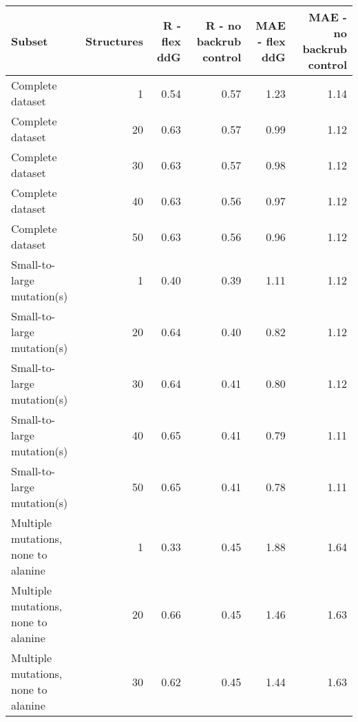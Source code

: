 \begin{table}
\begin{tabular}{lrrrrr}
\toprule
                              Subset &  Structures &  R - flex ddG &  R - no backrub control &  MAE - flex ddG &  MAE - no backrub control \\
\midrule
                    Complete dataset &           1 &          0.54 &                    0.57 &            1.23 &                      1.14 \\
                    Complete dataset &          20 &          0.63 &                    0.57 &            0.99 &                      1.12 \\
                    Complete dataset &          30 &          0.63 &                    0.57 &            0.98 &                      1.12 \\
                    Complete dataset &          40 &          0.63 &                    0.56 &            0.97 &                      1.12 \\
                    Complete dataset &          50 &          0.63 &                    0.56 &            0.96 &                      1.12 \\
          Small-to-large mutation(s) &           1 &          0.40 &                    0.39 &            1.11 &                      1.12 \\
          Small-to-large mutation(s) &          20 &          0.64 &                    0.40 &            0.82 &                      1.12 \\
          Small-to-large mutation(s) &          30 &          0.64 &                    0.41 &            0.80 &                      1.12 \\
          Small-to-large mutation(s) &          40 &          0.65 &                    0.41 &            0.79 &                      1.11 \\
          Small-to-large mutation(s) &          50 &          0.65 &                    0.41 &            0.78 &                      1.11 \\
 Multiple mutations, none to alanine &           1 &          0.33 &                    0.45 &            1.88 &                      1.64 \\
 Multiple mutations, none to alanine &          20 &          0.66 &                    0.45 &            1.46 &                      1.63 \\
 Multiple mutations, none to alanine &          30 &          0.62 &                    0.45 &            1.44 &                      1.63 \\

\end{tabular}
\end{table}
